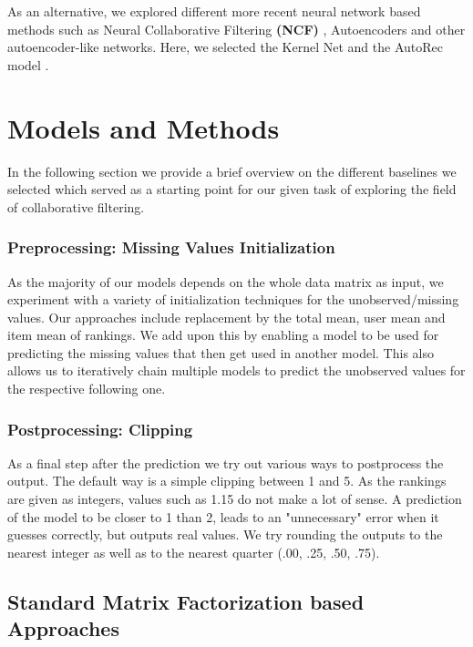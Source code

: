 \documentclass[10pt,conference,compsocconf]{IEEEtran}
\begin{document}
    As an alternative, we explored different more recent neural network based methods such as Neural Collaborative Filtering \textbf{(NCF)} \cite{DBLP:journals/corr/abs-1708-05031}, Autoencoders \cite{inproceedings} and other autoencoder-like networks.
    Here, we selected the Kernel Net \cite{pmlr-v80-muller18a} and the AutoRec model \cite{inproceedings}.


    \section{Models and Methods}
    In the following section we provide a brief overview on the different baselines we selected which served as a starting point for our given task of exploring the field of collaborative filtering.

    \subsubsection{Preprocessing: Missing Values Initialization}
    As the majority of our models depends on the whole data matrix as input, we experiment with a variety of initialization techniques for the unobserved/missing values.
    Our approaches include replacement by the total mean, user mean and item mean of rankings.
    We add upon this by enabling a model to be used for predicting the missing values that then get used in another model.
    This also allows us to iteratively chain multiple models to predict the unobserved values for the respective following one.

    \subsubsection{Postprocessing: Clipping}
    As a final step after the prediction we try out various ways to postprocess the output.
    The default way is a simple clipping between 1 and 5.
    As the rankings are given as integers, values such as 1.15 do not make a lot of sense.
    A prediction of the model to be closer to 1 than 2, leads to an "unnecessary" error when it guesses correctly, but outputs real values.
    We try rounding the outputs to the nearest integer as well as to the nearest quarter (.00, .25, .50, .75).

    \subsection{Standard Matrix Factorization based Approaches}
\end{document}
